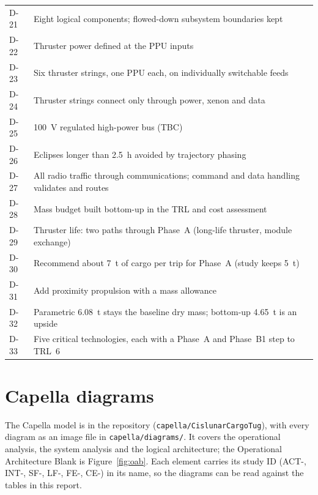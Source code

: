 \documentclass[11pt,a4paper]{article}
\newcommand{\id}[1]{#1}
\begin{document}
{\begin{longtable}{@{}P{1.0cm}P{14.4cm}@{}}
\id{D-21} & Eight logical components; flowed-down subsystem boundaries kept \\
\id{D-22} & Thruster power defined at the PPU inputs \\
\id{D-23} & Six thruster strings, one PPU each, on individually switchable feeds \\
\id{D-24} & Thruster strings connect only through power, xenon and data \\
\id{D-25} & 100~V regulated high-power bus (TBC) \\
\id{D-26} & Eclipses longer than 2.5~h avoided by trajectory phasing \\
\id{D-27} & All radio traffic through communications; command and data handling validates and routes \\
\id{D-28} & Mass budget built bottom-up in the TRL and cost assessment \\
\id{D-29} & Thruster life: two paths through Phase~A (long-life thruster, module exchange) \\
\id{D-30} & Recommend about 7~t of cargo per trip for Phase~A (study keeps 5~t) \\
\id{D-31} & Add proximity propulsion with a mass allowance \\
\id{D-32} & Parametric 6.08~t stays the baseline dry mass; bottom-up 4.65~t is an upside \\
\id{D-33} & Five critical technologies, each with a Phase~A and Phase~B1 step to TRL~6 \\
\end{longtable}
}

\newpage
\section{Capella diagrams}\label{app:capella}

The Capella model is in the repository (\texttt{capella/CislunarCargoTug}), with every diagram as an image file in \texttt{capella/diagrams/}. It covers the operational analysis, the system analysis and the logical architecture; the Operational Architecture Blank is Figure~\ref{fig:oab}. Each element carries its study ID (ACT-, INT-, SF-, LF-, FE-, CE-) in its name, so the diagrams can be read against the tables in this report.
\end{document}

